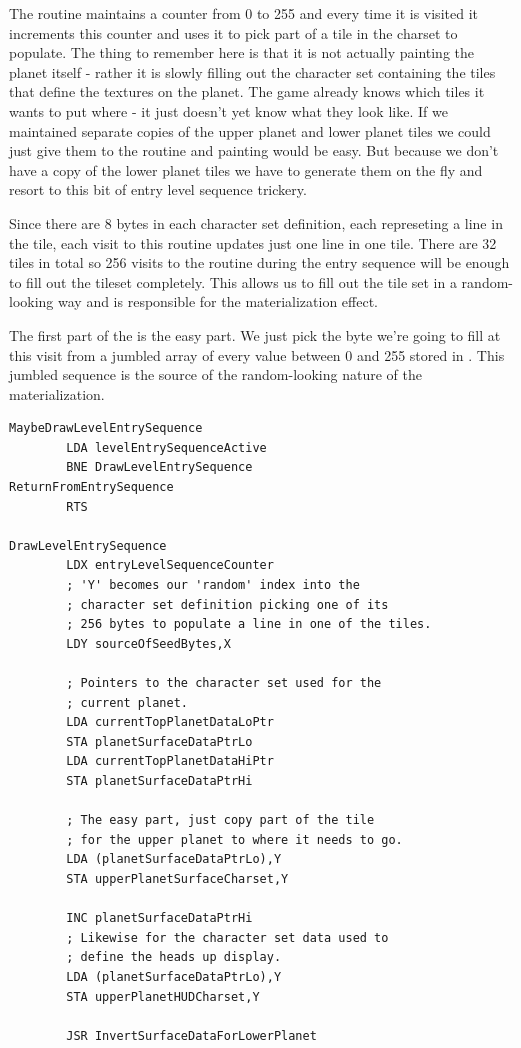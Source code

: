 The routine maintains a counter from 0 to 255 and every time it is visited it increments this counter and uses it
to pick part of a tile in the charset to populate. The thing to remember here is that it is not actually painting the planet
itself - rather it is slowly filling out the character set containing the tiles that define the textures on the planet.
The game already knows which tiles it wants to put where - it just doesn't yet know what they look like. If we maintained
separate copies of the upper planet and lower planet tiles we could just give them to the routine and painting would be easy.
But because we don't have a copy of the lower planet tiles we have to generate them on the fly and resort to this
bit of entry level sequence trickery.

Since there are 8 bytes in each character set definition, each represeting a line in the tile, 
each visit to this routine updates just one line in one tile. There are 32 tiles in total so 256 visits to the routine
during the entry sequence will be enough to fill out the tileset completely. This allows
us to fill out the tile set in a random-looking way and is responsible for the materialization effect.

The first part of the  is the easy part. We just pick the byte we're going to fill
at this visit from a jumbled array of every value between 0 and 255 stored in . This jumbled
sequence is the source of the random-looking nature of the materialization.

\begin{lstlisting}[caption=The start of \icode{MaybeDrawLevelEntrySequence}. As long as \icode{levelEntrySequenceActive}
is non-zero\, \icode{DrawLevelEntrySequence} will run.]
MaybeDrawLevelEntrySequence
        LDA levelEntrySequenceActive
        BNE DrawLevelEntrySequence
ReturnFromEntrySequence   
        RTS

DrawLevelEntrySequence   
        LDX entryLevelSequenceCounter
        ; 'Y' becomes our 'random' index into the
        ; character set definition picking one of its
        ; 256 bytes to populate a line in one of the tiles.
        LDY sourceOfSeedBytes,X

        ; Pointers to the character set used for the
        ; current planet.
        LDA currentTopPlanetDataLoPtr
        STA planetSurfaceDataPtrLo
        LDA currentTopPlanetDataHiPtr
        STA planetSurfaceDataPtrHi

        ; The easy part, just copy part of the tile
        ; for the upper planet to where it needs to go.
        LDA (planetSurfaceDataPtrLo),Y
        STA upperPlanetSurfaceCharset,Y

        INC planetSurfaceDataPtrHi
        ; Likewise for the character set data used to 
        ; define the heads up display.
        LDA (planetSurfaceDataPtrLo),Y
        STA upperPlanetHUDCharset,Y

        JSR InvertSurfaceDataForLowerPlanet
\end{lstlisting}


